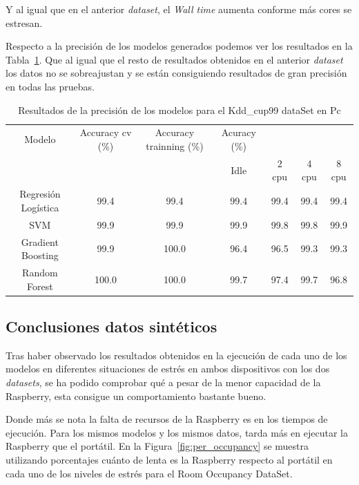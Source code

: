 \documentclass[a4paper, 12pt]{book}
\begin{document}
Y al igual que en el anterior \textit{dataset}, el \textit{Wall time} aumenta conforme más cores se estresan.

Respecto a la precisión de los modelos generados podemos ver los resultados en la Tabla~\ref{tab:acc_Kddpc}. Que al igual que el resto de resultados obtenidos en el anterior \textit{dataset} los datos no se sobreajustan y se están consiguiendo resultados de gran precisión en todas las pruebas.

\begin{table}[]
\begin{adjustbox}{width=\textwidth}
\centering
    \begin{tabular}{c  c  c  c  c  c  c}
    \hline
    Modelo & Accuracy cv (\%) & Accuracy trainning (\%) & Acuracy (\%) & & & \\
    \cline{4-7}
     &  &   &  Idle & 2 cpu & 4 cpu & 8 cpu \\
     \hline
     Regresión Logística & 99.4 & 99.4 & 99.4 & 99.4 & 99.4 & 99.4\\
     SVM & 99.9 & 99.9 & 99.9 & 99.8 & 99.8 & 99.9\\
     Gradient Boosting & 99.9 & 100.0 & 96.4 & 96.5 & 99.3 & 99.3 \\
     Random Forest & 100.0 & 100.0 & 99.7 & 97.4 & 99.7 & 96.8\\
    \hline
    \end{tabular}
\end{adjustbox}
\caption{Resultados de la precisión de los modelos para el Kdd\_cup99 dataSet en Pc}
\label{tab:acc_Kddpc}
\end{table}

\subsection{Conclusiones datos sintéticos}
\label{subsec:conclusion_sinteticos}

Tras haber observado los resultados obtenidos en la ejecución de cada uno de los modelos en diferentes situaciones de estrés en ambos dispositivos con los dos \textit{datasets}, se ha podido comprobar qué a pesar de la menor capacidad de la Raspberry, esta consigue un comportamiento bastante bueno.

Donde más se nota la falta de recursos de la Raspberry es en los tiempos de ejecución. Para los mismos modelos y los mismos datos, tarda más en ejecutar la Raspberry que el portátil. En la Figura~\ref{fig:per_occupancy} se muestra utilizando porcentajes cuánto de lenta es la Raspberry respecto al portátil en cada uno de los niveles de estrés para el Room Occupancy DataSet.
\end{document}
